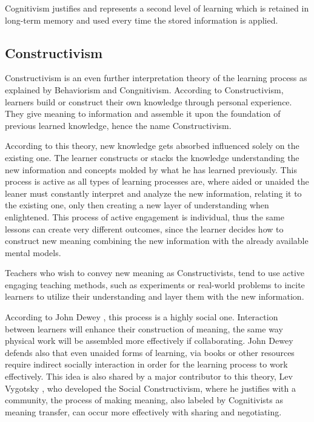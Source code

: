 Cognitivism justifies and represents a second level of learning which is retained
in long-term memory and used every time the stored information is applied.




\subsection{Constructivism}

Constructivism is an even further interpretation theory of the learning process 
as explained by Behaviorism and Congnitivism. According to Constructivism, learners
build or construct their own knowledge through personal experience. They give meaning
to information and assemble it upon the foundation of previous learned knowledge, 
hence the name Constructivism.

According to this theory, new knowledge gets absorbed influenced solely on the 
existing one. The learner constructs or stacks the knowledge understanding the new 
information and concepts molded by what he has learned previously. This process is
active \cite{adler_1970} as all types of learning processes are, where aided or 
unaided the leaner must constantly interpret and analyze the new information,
relating it to the existing one, only then creating a new layer of understanding 
when enlightened. This process of active engagement is individual, thus the same 
lessons can create very different outcomes, since the learner decides how to construct
new meaning combining the new information with the already available mental models.

Teachers who wish to convey new meaning as Constructivists, tend to use active 
engaging teaching methods, such as experiments or real-world problems to incite
learners to utilize their understanding and layer them with the new information.

According to John Dewey \cite{dewey_1938}, this process is a highly social one. 
Interaction between learners will enhance their construction of meaning, the same
way physical work will be assembled more effectively if collaborating.
John Dewey defends also that even unaided forms of learning, via books or other 
resources require indirect socially interaction in order for the learning process 
to work effectively. This idea is also shared by a major contributor to this theory,
Lev Vygotsky \cite{vygotsky_1978}, who developed the Social Constructivism, where 
he justifies with a community, the process of making meaning, also labeled by
Cognitivists as meaning transfer, can occur more effectively with sharing and 
negotiating.

